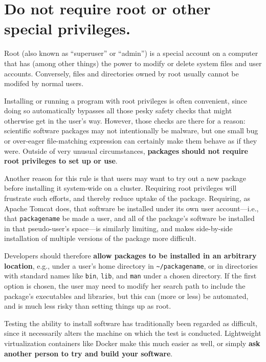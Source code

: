 \documentclass[10pt,letterpaper]{article}
\begin{document}
\section{Do not require root or other special privileges.}

Root (also known as ``superuser'' or ``admin'') is a special account on
a computer that has (among other things) the power to modify or delete
system files and user accounts. Conversely, files and directories owned
by root usually cannot be modifed by normal users.

Installing or running a program with root privileges is often
convenient, since doing so automatically bypasses all those pesky safety
checks that might otherwise get in the user's way. However, those checks
are there for a reason: scientific software packages may not
intentionally be malware, but one small bug or over-eager file-matching
expression can certainly make them behave as if they were. Outside of
very unusual circumstances,
\textbf{packages should not require root privileges to set up or use}.

Another reason for this rule is that users may want to try out a new
package before installing it system-wide on a cluster. Requiring root
privileges will frustrate such efforts, and thereby reduce uptake of the
package. Requiring, as Apache Tomcat does, that software be installed
under its own user account---i.e.,
that \texttt{packagename} be made a user, and all of the
package's software be installed in that pseudo-user's space---is similarly limiting,
and makes side-by-side installation of multiple versions of
the package more difficult.

Developers should therefore
\textbf{allow packages to be installed in an arbitrary location},
e.g., under a user's home directory in
\texttt{\textasciitilde{}/packagename}, or in directories with standard
names like \texttt{bin}, \texttt{lib}, and \texttt{man} under a chosen
directory. If the first option is chosen, the user may need to modify
her search path to include the package's executables and libraries, but
this can (more or less) be automated, and is much less risky than
setting things up as root.

Testing the ability to install software has traditionally been regarded as difficult,
since it necessarily alters the machine on which the test is conducted.
Lightweight virtualization containers like Docker make this much easier as well, 
or simply \textbf{ask another person to try and build your software}.
\end{document}
